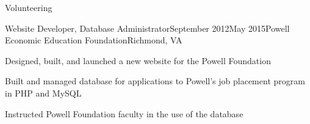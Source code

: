 \documentclass{resume} %
\begin{document}

\begin{rSection}{Volunteering}

\begin{rSubsection}{Website Developer, Database Administrator}{September 2012\textminus May 2015}{Powell Economic Education Foundation}{Richmond, VA}
\item[] Designed, built, and launched a new website for the Powell Foundation
\item[] Built and managed database for applications to Powell's job placement program in PHP and MySQL
\item[] Instructed Powell Foundation faculty in the use of the database
\end{rSubsection}
\end{rSection}











\end{document}

